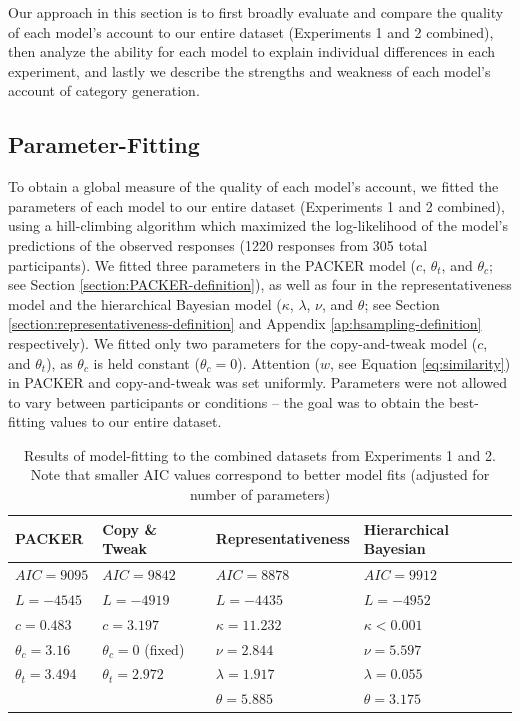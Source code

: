 \documentclass[12pt]{article}
\begin{document}
\begin{flushleft}
Our approach in this section is to first broadly evaluate and compare the
quality of each model's account to our entire dataset (Experiments 1 and 2
combined), then analyze the ability for each model to explain individual
differences in each experiment, and lastly we describe the strengths and
weakness of each model's account of category generation.

\subsection{Parameter-Fitting}

To obtain a global measure of the quality of each model's account, we fitted the
parameters of each model to our entire dataset (Experiments 1 and 2 combined),
using a hill-climbing algorithm which maximized the log-likelihood of the
model's predictions of the observed responses (1220 responses from 305 total
participants). We fitted three parameters in the PACKER model ($c$, $\theta_t$,
and $\theta_c$; see Section \ref{section:PACKER-definition}), as well as four in
the representativeness model and the hierarchical Bayesian model ($\kappa$,
$\lambda$, $\nu$, and $\theta$; see Section
\ref{section:representativeness-definition} and Appendix
\ref{ap:hsampling-definition} respectively). We fitted only two parameters for
the copy-and-tweak model ($c$, and $\theta_t$), as $\theta_c$ is held constant
($\theta_c = 0$). Attention ($w$, see Equation \ref{eq:similarity}) in PACKER
and copy-and-tweak was set uniformly. Parameters were not allowed to vary
between participants or conditions -- the goal was to obtain the best-fitting
values to our entire dataset.

\begin{table} \centering
\caption{Results of model-fitting to the combined datasets from Experiments 1
and 2. Note that smaller AIC values correspond to better model fits (adjusted
for number of parameters)}
\label{table:global-model-fits}
\begin{tabular}{ l l l l} \\ \textbf{PACKER} & \textbf{Copy \& Tweak} &
\textbf{Representativeness} & \textbf{Hierarchical Bayesian} \\ \hline $AIC =
  9095$ & $AIC = 9842$ & $AIC = 8878$ &  $AIC =
9912$ \\ $L = -4545$ & $L = -4919$ & $L = -4435$ & $L = -4952$ \\ $c = 0.483$ &
                                                                                $c = 3.197$ & $\kappa = 11.232$ &
$\kappa < 0.001$ \\ $\theta_c = 3.16$ & $\theta_c = 0$ (fixed) & $\nu = 2.844$ & $\nu = 5.597$ \\
$\theta_t = 3.494$ & $\theta_t = 2.972$ & $\lambda = 1.917$& $\lambda
                                                                       = 0.055$
  \\ & &$\theta = 5.885 $& $\theta = 3.175$
\\
\end{tabular}
\end{table}



\end{flushleft}
\end{document}
